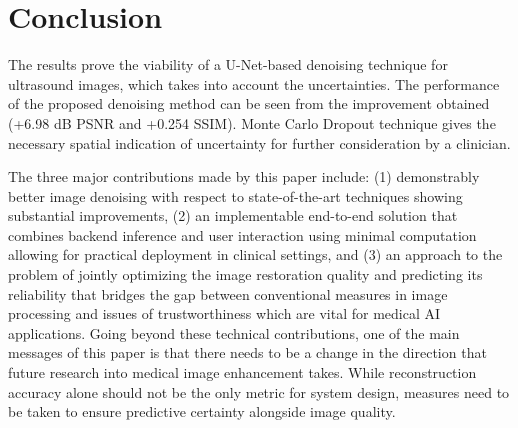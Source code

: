 \documentclass[conference]{IEEEtran}
\begin{document}
\section{Conclusion}
The results prove the viability of a U-Net-based denoising technique for ultrasound images, which takes into account the uncertainties. The performance of the proposed denoising method can be seen from the improvement obtained (+6.98 dB PSNR and +0.254 SSIM). Monte Carlo Dropout technique gives the necessary spatial indication of uncertainty for further consideration by a clinician.

The three major contributions made by this paper include: (1) demonstrably better image denoising with respect to state-of-the-art techniques showing substantial improvements, (2) an implementable end-to-end solution that combines backend inference and user interaction using minimal computation allowing for practical deployment in clinical settings, and (3) an approach to the problem of jointly optimizing the image restoration quality and predicting its reliability that bridges the gap between conventional measures in image processing and issues of trustworthiness which are vital for medical AI applications. Going beyond these technical contributions, one of the main messages of this paper is that there needs to be a change in the direction that future research into medical image enhancement takes. While reconstruction accuracy alone should not be the only metric for system design, measures need to be taken to ensure predictive certainty alongside image quality.
\end{document}
